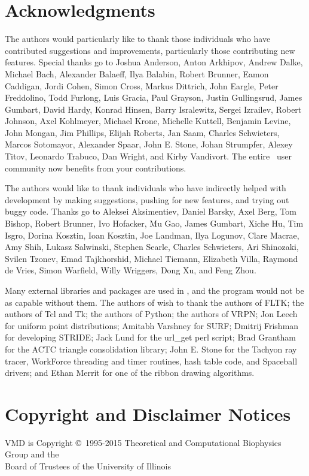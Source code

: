 \section{Acknowledgments}

The authors would particularly like to thank those individuals 
who have contributed suggestions and improvements, particularly 
those contributing new features.  Special thanks go to 
Joshua Anderson, Anton Arkhipov, Andrew Dalke, Michael Bach, 
Alexander Balaeff, Ilya Balabin, Robert Brunner,
Eamon Caddigan, Jordi Cohen, Simon Cross,
Markus Dittrich, John Eargle, 
Peter Freddolino, Todd Furlong, Luis Gracia, 
Paul Grayson, Justin Gullingsrud, James Gumbart,
David Hardy, Konrad Hinsen,
Barry Isralewitz, Sergei Izrailev, Robert Johnson,
Axel Kohlmeyer, Michael Krone, Michelle Kuttell, Benjamin Levine,
John Mongan, Jim Phillips, Elijah Roberts, Jan Saam, 
Charles Schwieters, Marcos Sotomayor, Alexander Spaar,
John E. Stone, Johan Strumpfer,
Alexey Titov, Leonardo Trabuco, Dan Wright, and Kirby Vandivort.
The entire \VMD\ user community now benefits from your contributions.

The authors would like to thank individuals
who have indirectly helped with development 
by making suggestions, pushing for new features, and trying out buggy code.  
Thanks go to 
Aleksei Aksimentiev, Daniel Barsky, Axel Berg, 
Tom Bishop, Robert Brunner, Ivo Hofacker, Mu Gao, 
James Gumbart, Xiche Hu, Tim Isgro, Dorina Kosztin, Ioan Kosztin, 
Joe Landman, Ilya Logunov, Clare Macrae, Amy Shih, 
Lukasz Salwinski, Stephen Searle, Charles Schwieters, 
Ari Shinozaki, Svilen Tzonev, Emad Tajkhorshid, Michael Tiemann, 
Elizabeth Villa, Raymond de Vries, Simon Warfield,
Willy Wriggers, Dong Xu, and Feng Zhou.  

Many external libraries and packages are used in \VMD, and the 
program would not be as capable without them.  
The authors of \VMD wish to thank
the authors of FLTK;
the authors of Tcl and Tk; 
the authors of Python; 
the authors of VRPN;
Jon Leech for uniform point distributions;
Amitabh Varshney for SURF;
Dmitrij Frishman for developing STRIDE; 
Jack Lund for the url\_get perl script; 
Brad Grantham for the ACTC triangle consolidation library;
John E. Stone for the Tachyon ray tracer, WorkForce threading and timer routines, hash table code, and Spaceball drivers;
and 
Ethan Merrit for one of the ribbon drawing algorithms. 


\section{Copyright and Disclaimer Notices}
\begin{center}
VMD is  Copyright \copyright\ 1995-2015 
Theoretical and Computational Biophysics Group and the \\
Board of Trustees of the University of Illinois
\end{center}

